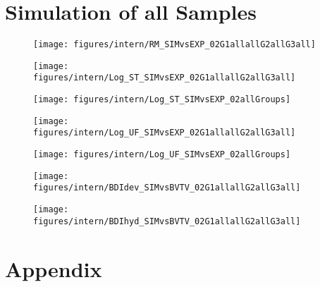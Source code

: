 \documentclass[12pt, a4paper, twoside]{report}
\begin{document}
\chapter{Simulation of all Samples}
%
\begin{figure}[H]
\centering 
\label{sublable2}\texttt{[image: figures/intern/RM\_SIMvsEXP\_02G1allallG2allG3all]}
\label{fig:New_Imp}
\end{figure}
%
\begin{figure}[H]
\centering 
\label{sublable2}\texttt{[image: figures/intern/Log\_ST\_SIMvsEXP\_02G1allallG2allG3all]}
\label{fig:New_Imp}
\end{figure}
%
\begin{figure}[H]
\centering 
\label{sublable2}\texttt{[image: figures/intern/Log\_ST\_SIMvsEXP\_02allGroups]}
\label{fig:New_Imp}
\end{figure}
%
\begin{figure}[H]
\centering 
\label{sublable2}\texttt{[image: figures/intern/Log\_UF\_SIMvsEXP\_02G1allallG2allG3all]}
\label{fig:New_Imp}
\end{figure}
%
\begin{figure}[H]
\centering 
\label{sublable2}\texttt{[image: figures/intern/Log\_UF\_SIMvsEXP\_02allGroups]}
\label{fig:New_Imp}
\end{figure}
%
\begin{figure}[H]
\centering 
\label{sublable2}\texttt{[image: figures/intern/BDIdev\_SIMvsBVTV\_02G1allallG2allG3all]}
\label{fig:New_Imp}
\end{figure}
%
\begin{figure}[H]
\centering 
\label{sublable2}\texttt{[image: figures/intern/BDIhyd\_SIMvsBVTV\_02G1allallG2allG3all]}
\label{fig:New_Imp}
\end{figure}
%
\appendix
\chapter{Appendix}
\newpage
\end{document}
